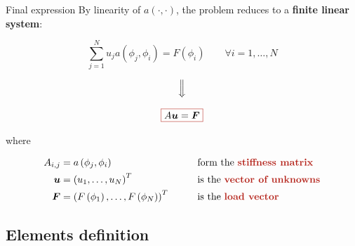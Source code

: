 \begin{frame}{Final expression}
   By linearity of $a(\cdot,\cdot)$, the problem reduces to a \textbf{finite linear system}:

   \begin{equation*}
      \sum_{j=1}^Nu_ja\left(\phi_j,\phi_i\right)=F\left(\phi_i\right) \qquad \forall i=1,\dots,N
   \end{equation*}

   \vspace{-0.1cm}

   \begin{equation*}
      \Big\Downarrow
   \end{equation*}

   \vspace{-0.1cm}

   \begin{equation*}
      \fcolorbox{BrickRed}{white}{\text{$A\boldsymbol{u}=\boldsymbol{F}$}}
   \end{equation*}

   \pause

   where

   \begin{alignat*}{2}
      A_{i,j}&=a\left(\phi_j,\phi_i\right) &&\text{form the \textbf{\textcolor{BrickRed}{stiffness matrix}}}\\
      \boldsymbol{u}&=\left(u_1,\dots,u_N\right)^T &&\text{is the \textbf{\textcolor{BrickRed}{vector of unknowns}}}\\
      \boldsymbol{F}&=\left(F\left(\phi_1\right),\dots,F\left(\phi_N\right)\right)^T \qquad &&\text{is the \textbf{\textcolor{BrickRed}{load vector}}} 
   \end{alignat*}
\end{frame}

\subsection{Elements definition}


